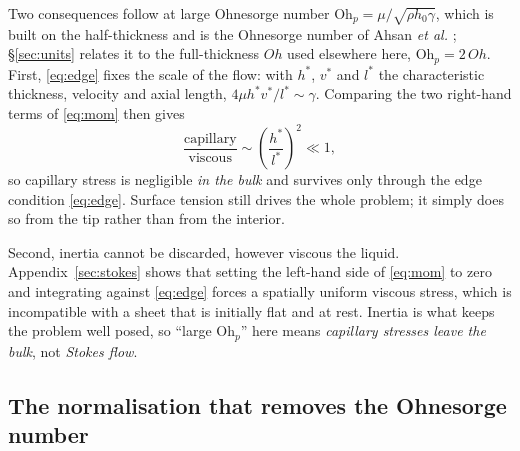 \documentclass[11pt,a4paper]{article}
\newcommand{\Ohp}{\mathrm{Oh}_{p}}
\begin{document}
Two consequences follow at large Ohnesorge number
$\Ohp = \mu/\sqrt{\rho h_{0}\gamma}$, which is built on the half-thickness and
is the Ohnesorge number of Ahsan \textit{et al.} \cite{ahsan2025}; \S\ref{sec:units} relates it to the
full-thickness $Oh$ used elsewhere here, $\Ohp = 2\,Oh$. First, \eqref{eq:edge} fixes the
scale of the flow: with $h^{*}$, $v^{*}$ and $l^{*}$ the characteristic
thickness, velocity and axial length, $4\mu h^{*} v^{*}/l^{*} \sim \gamma$.
Comparing the two right-hand terms of \eqref{eq:mom} then gives
%
\begin{equation}
  \frac{\text{capillary}}{\text{viscous}} \sim \left(\frac{h^{*}}{l^{*}}\right)^{2} \ll 1 ,
  \label{eq:capsmall}
\end{equation}
%
so capillary stress is negligible \emph{in the bulk} and survives only through
the edge condition \eqref{eq:edge}. Surface tension still drives the whole
problem; it simply does so from the tip rather than from the interior.

Second, inertia cannot be discarded, however viscous the liquid. Appendix~\ref{sec:stokes} shows that
setting the left-hand side of \eqref{eq:mom} to zero and integrating against
\eqref{eq:edge} forces a spatially uniform viscous stress, which is
incompatible with a sheet that is initially flat and at rest. Inertia is what
keeps the problem well posed, so ``large $\Ohp$'' here means
\emph{capillary stresses leave the bulk}, not \emph{Stokes flow}.

\subsection{The normalisation that removes the Ohnesorge number}
\label{sec:removeoh}
\end{document}

